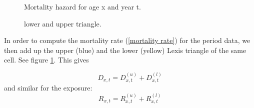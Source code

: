     \begin{figure}[tbh]
    \begin{minipage}[b]{0.40\linewidth}
        \centering
        \caption{ Mortality hazard for age x and year t.}
        \label{fig:mortality}
   \end{minipage}
  \hspace{0.5cm}
     \begin{minipage}[b]{0.40\linewidth}
        \caption{ lower and upper triangle.  \label{fig:lower-and-upper-triangle}}
   \end{minipage}
   \end{figure}



In order to compute the mortality rate (\ref{mortality rate}) for the period data, we then add up the upper (blue) and the lower (yellow) Lexis triangle of the same cell. See figure \ref{fig:lower-and-upper-triangle}. This gives  
 
    \begin{equation}
        {D}_{x,t} = {D}_{x,t}^{(u)} + {D}_{x,t}^{(l)}
        \label{eq:death period}
    \end{equation}
and similar for the exposure:   
    \begin{equation}
        {R}_{x,t} = {R}_{x,t}^{(u)} + {R}_{x,t}^{(l)}
        \label{eq:exposure period}
    \end{equation}
    

